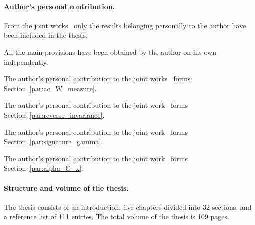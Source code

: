 \paragraph{Author's personal contribution.}

From the joint works~
only the results belonging personally to the author have been included in the thesis.

All the main provisions have been obtained by the author on his own independently.

The author's personal contribution to the joint works~\cite{our-mz2019measure,avdeed2021AandA}
forms Section~\ref{par:ac_W_measure}.

The author's personal contribution to the joint work~\cite{avdeev2024decomposition}
forms Section~\ref{par:reverse_invariance}.

The author's personal contribution to the joint work~\cite{avdeev2024set_DAN_rus}
forms Section~\ref{par:signature_gamma}.

The author's personal contribution to the joint work~\cite{our-vzms-2018}
forms Section~\ref{par:alpha_C_x}.




\paragraph{Structure and volume of the thesis.}
The thesis consists of an introduction, five chapters divided into
32 sections,
and a reference list of
111 entries.
The total volume of the thesis is
109 pages.
